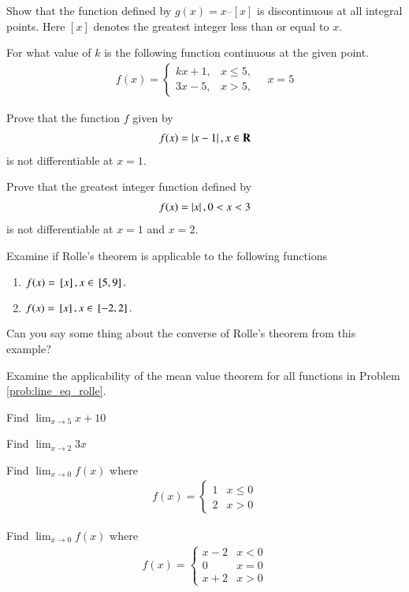 \item Show that the function defined by $g (x) = x – [x]$ is discontinuous at all integral points. Here $[x]$ denotes the greatest integer less than or equal to $x$.
\item For what value of $k$ is the following function 
%
continuous at the given point.
\begin{align}
f(x)=
\begin{cases}
kx+1, & x \le 5,
\\
3x-5, & x > 5,
\end{cases}
\quad x = 5
\end{align}
\item Prove that the function $f$ given by 
\begin{align}
f(x) = \left\vert x-1\right\vert, x \in \mathbf{R}
\end{align}
%
is not differentiable at $x = 1$.
\item Prove that the greatest integer function defined by 
\begin{align}
f(x) = \left\vert x\right\vert, 0 < x < 3
\end{align}
%
is not differentiable at $x = 1$ and $x = 2$.
\item Examine if Rolle's theorem is applicable to the following functions
\begin{enumerate}
\item 
\label{prob:line_eq_rolle}
$
f(x) = {}\left[x\right], x \in {}\left[5,9\right].
$
\item 
$
f(x) = {}\left[x\right], x \in {}\left[-2,2\right].
$
\end{enumerate}
Can you say some thing about the converse of Rolle's theorem from this example?
\item  Examine the applicability of the mean value theorem for all functions in Problem \ref{prob:line_eq_rolle}.
%
\item Find $\lim_{x\to 5} x+10$
\item Find $\lim_{x\to 2} 3x$
\item Find $\lim_{x\to 0}f(x)$ where
%
\begin{align}
f(x)  = 
\begin{cases}
1 & x \le 0
\\
2 & x > 0
\end{cases}
\end{align}
\item Find $\lim_{x\to 0}f(x)$ where
%
\begin{align}
f(x)  = 
\begin{cases}
x-2 & x < 0
\\
0 & x = 0
\\
x+2 & x > 0
\end{cases}
\end{align}
